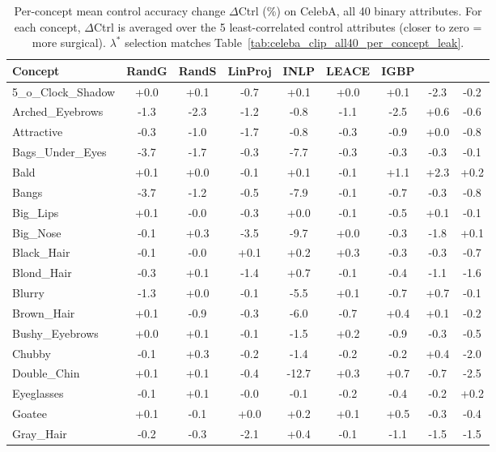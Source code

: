 \begin{table}[p]
\centering
\caption{Per-concept mean control accuracy change $\Delta$Ctrl (\%) on CelebA, all 40 binary attributes. For each concept, $\Delta$Ctrl is averaged over the 5 least-correlated control attributes (closer to zero = more surgical). $\lambda^*$ selection matches Table~\ref{tab:celeba_clip_all40_per_concept_leak}.}
\label{tab:celeba_clip_all40_per_concept_ctrl}
\footnotesize
\setlength{\tabcolsep}{3pt}
\begin{tabular}{l|cccccccc}
\toprule
Concept & RandG & RandS & LinProj & INLP & LEACE & IGBP & \AmbGCE{} & \TanGCE{} \\
\midrule
5\_o\_Clock\_Shadow & +0.0 & +0.1 & -0.7 & +0.1 & +0.0 & +0.1 & -2.3 & -0.2 \\
Arched\_Eyebrows & -1.3 & -2.3 & -1.2 & -0.8 & -1.1 & -2.5 & +0.6 & -0.6 \\
Attractive & -0.3 & -1.0 & -1.7 & -0.8 & -0.3 & -0.9 & +0.0 & -0.8 \\
Bags\_Under\_Eyes & -3.7 & -1.7 & -0.3 & -7.7 & -0.3 & -0.3 & -0.3 & -0.1 \\
Bald & +0.1 & +0.0 & -0.1 & +0.1 & -0.1 & +1.1 & +2.3 & +0.2 \\
Bangs & -3.7 & -1.2 & -0.5 & -7.9 & -0.1 & -0.7 & -0.3 & -0.8 \\
Big\_Lips & +0.1 & -0.0 & -0.3 & +0.0 & -0.1 & -0.5 & +0.1 & -0.1 \\
Big\_Nose & -0.1 & +0.3 & -3.5 & -9.7 & +0.0 & -0.3 & -1.8 & +0.1 \\
Black\_Hair & -0.1 & -0.0 & +0.1 & +0.2 & +0.3 & -0.3 & -0.3 & -0.7 \\
Blond\_Hair & -0.3 & +0.1 & -1.4 & +0.7 & -0.1 & -0.4 & -1.1 & -1.6 \\
Blurry & -1.3 & +0.0 & -0.1 & -5.5 & +0.1 & -0.7 & +0.7 & -0.1 \\
Brown\_Hair & +0.1 & -0.9 & -0.3 & -6.0 & -0.7 & +0.4 & +0.1 & -0.2 \\
Bushy\_Eyebrows & +0.0 & +0.1 & -0.1 & -1.5 & +0.2 & -0.9 & -0.3 & -0.5 \\
Chubby & -0.1 & +0.3 & -0.2 & -1.4 & -0.2 & -0.2 & +0.4 & -2.0 \\
Double\_Chin & +0.1 & +0.1 & -0.4 & -12.7 & +0.3 & +0.7 & -0.7 & -2.5 \\
Eyeglasses & -0.1 & +0.1 & -0.0 & -0.1 & -0.2 & -0.4 & -0.2 & +0.2 \\
Goatee & +0.1 & -0.1 & +0.0 & +0.2 & +0.1 & +0.5 & -0.3 & -0.4 \\
Gray\_Hair & -0.2 & -0.3 & -2.1 & +0.4 & -0.1 & -1.1 & -1.5 & -1.5 \\

\end{tabular}
\end{table}
